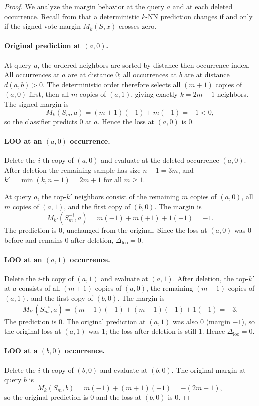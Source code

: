 \begin{proof}
We analyze the margin behavior at the query $a$ and at each deleted occurrence.
Recall from  that a deterministic $k$-NN prediction changes
if and only if the signed vote margin $M_k(S, x)$ crosses zero.

\paragraph{Original prediction at $(a,0)$.}
At query $a$, the ordered neighbors are sorted by distance then occurrence index.
All occurrences at $a$ are at distance $0$; all occurrences at $b$ are at
distance $d(a,b) > 0$. The deterministic order therefore selects all
$(m+1)$ copies of $(a,0)$ first, then all $m$ copies of $(a,1)$, giving exactly
$k = 2m+1$ neighbors. The signed margin is
\[
M_k(S_m, a) = (m+1)(-1) + m(+1) = -1 < 0,
\]
so the classifier predicts $0$ at $a$. Hence the loss at $(a,0)$ is $0$.

\paragraph{LOO at an $(a,0)$ occurrence.}
Delete the $i$-th copy of $(a,0)$ and evaluate at the deleted occurrence
$(a,0)$. After deletion the remaining sample has size $n-1 = 3m$, and
$k' = \min(k, n-1) = 2m+1$ for all $m \ge 1$.

At query $a$, the top-$k'$ neighbors consist of the remaining $m$ copies
of $(a,0)$, all $m$ copies of $(a,1)$, and the first copy of $(b,0)$.
The margin is
\[
M_{k'}(S_m^{-i}, a) = m(-1) + m(+1) + 1(-1) = -1.
\]
The prediction is $0$, unchanged from the original. Since the loss at $(a,0)$
was $0$ before and remains $0$ after deletion, $\Delta_{\mathrm{loo}} = 0$.

\paragraph{LOO at an $(a,1)$ occurrence.}
Delete the $i$-th copy of $(a,1)$ and evaluate at $(a,1)$. After deletion,
the top-$k'$ at $a$ consists of all $(m+1)$ copies of $(a,0)$, the remaining
$(m-1)$ copies of $(a,1)$, and the first copy of $(b,0)$. The margin is
\[
M_{k'}(S_m^{-i}, a) = (m+1)(-1) + (m-1)(+1) + 1(-1) = -3.
\]
The prediction is $0$. The original prediction at $(a,1)$ was also $0$
(margin $-1$), so the original loss at $(a,1)$ was $1$; the loss after deletion
is still $1$. Hence $\Delta_{\mathrm{loo}} = 0$.

\paragraph{LOO at a $(b,0)$ occurrence.}
Delete the $i$-th copy of $(b,0)$ and evaluate at $(b,0)$. The original margin
at query $b$ is
\[
M_k(S_m, b) = m(-1) + (m+1)(-1) = -(2m+1),
\]
so the original prediction is $0$ and the loss at $(b,0)$ is $0$.


\end{proof}
